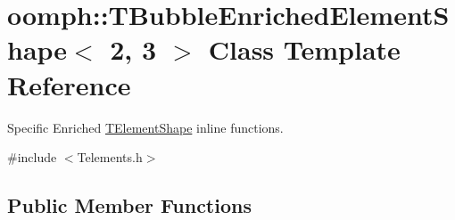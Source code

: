 \hypertarget{classoomph_1_1TBubbleEnrichedElementShape_3_012_00_013_01_4}{}\section{oomph\+:\+:T\+Bubble\+Enriched\+Element\+Shape$<$ 2, 3 $>$ Class Template Reference}
\label{classoomph_1_1TBubbleEnrichedElementShape_3_012_00_013_01_4}


Specific Enriched \hyperlink{classoomph_1_1TElementShape}{T\+Element\+Shape} inline functions.  




{\ttfamily \#include $<$Telements.\+h$>$}

\subsection*{Public Member Functions}
